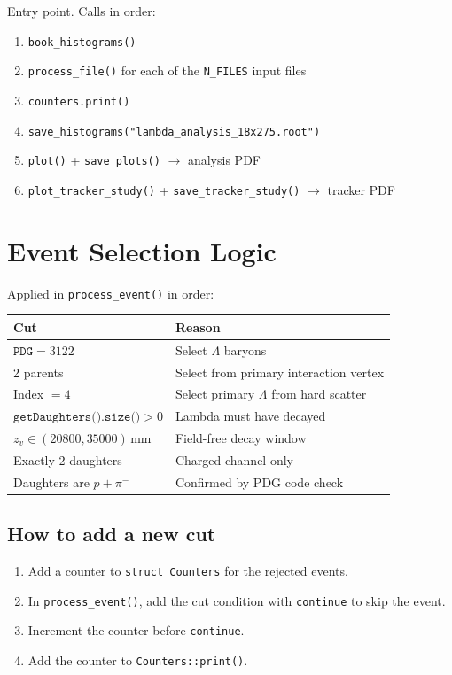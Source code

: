 \documentclass[11pt]{article}
\begin{document}
Entry point. Calls in order:
\begin{enumerate}
  \item \texttt{book\_histograms()}
  \item \texttt{process\_file()} for each of the \texttt{N\_FILES} input files
  \item \texttt{counters.print()}
  \item \texttt{save\_histograms("lambda\_analysis\_18x275.root")}
  \item \texttt{plot()} + \texttt{save\_plots()} $\to$ analysis PDF
  \item \texttt{plot\_tracker\_study()} + \texttt{save\_tracker\_study()} $\to$ tracker PDF
\end{enumerate}

\section{Event Selection Logic}

Applied in \texttt{process\_event()} in order:

\begin{center}
\renewcommand{\arraystretch}{1.4}
\begin{tabular}{lp{9cm}}
\toprule
Cut & Reason \\
\midrule
$\texttt{PDG} = 3122$ & Select $\Lambda$ baryons \\
2 parents & Select from primary interaction vertex \\
Index $= 4$ & Select primary $\Lambda$ from hard scatter \\
$\texttt{getDaughters().size()} > 0$ & Lambda must have decayed \\
$z_v \in (20800, 35000)\,\text{mm}$ & Field-free decay window \\
Exactly 2 daughters & Charged channel only \\
Daughters are $p + \pi^-$ & Confirmed by PDG code check \\
\bottomrule
\end{tabular}
\end{center}

\subsection{How to add a new cut}

\begin{enumerate}
  \item Add a counter to \texttt{struct Counters} for the rejected events.
  \item In \texttt{process\_event()}, add the cut condition with
        \texttt{continue} to skip the event.
  \item Increment the counter before \texttt{continue}.
  \item Add the counter to \texttt{Counters::print()}.
\end{enumerate}
\end{document}
